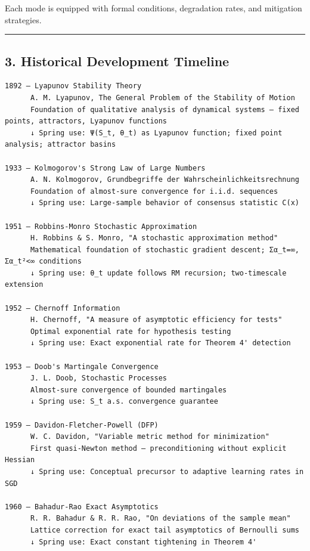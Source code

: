 \documentclass[
  12pt,
]{article}
\begin{document}
Each mode is equipped with formal conditions, degradation rates, and mitigation strategies.

\begin{center}\rule{0.5\linewidth}{0.5pt}\end{center}

\subsection{3. Historical Development Timeline}\label{historical-development-timeline}

\begin{verbatim}
1892 — Lyapunov Stability Theory
      A. M. Lyapunov, The General Problem of the Stability of Motion
      Foundation of qualitative analysis of dynamical systems — fixed points, attractors, Lyapunov functions
      ↓ Spring use: Ψ(S_t, θ_t) as Lyapunov function; fixed point analysis; attractor basins
      
1933 — Kolmogorov's Strong Law of Large Numbers
      A. N. Kolmogorov, Grundbegriffe der Wahrscheinlichkeitsrechnung
      Foundation of almost-sure convergence for i.i.d. sequences
      ↓ Spring use: Large-sample behavior of consensus statistic C(x)

1951 — Robbins-Monro Stochastic Approximation
      H. Robbins & S. Monro, "A stochastic approximation method"
      Mathematical foundation of stochastic gradient descent; Σα_t=∞, Σα_t²<∞ conditions
      ↓ Spring use: θ_t update follows RM recursion; two-timescale extension

1952 — Chernoff Information
      H. Chernoff, "A measure of asymptotic efficiency for tests"
      Optimal exponential rate for hypothesis testing
      ↓ Spring use: Exact exponential rate for Theorem 4' detection

1953 — Doob's Martingale Convergence
      J. L. Doob, Stochastic Processes
      Almost-sure convergence of bounded martingales
      ↓ Spring use: S_t a.s. convergence guarantee

1959 — Davidon-Fletcher-Powell (DFP)
      W. C. Davidon, "Variable metric method for minimization"
      First quasi-Newton method — preconditioning without explicit Hessian
      ↓ Spring use: Conceptual precursor to adaptive learning rates in SGD

1960 — Bahadur-Rao Exact Asymptotics
      R. R. Bahadur & R. R. Rao, "On deviations of the sample mean"
      Lattice correction for exact tail asymptotics of Bernoulli sums
      ↓ Spring use: Exact constant tightening in Theorem 4'


\end{verbatim}
\end{document}
